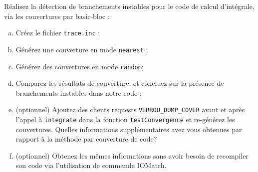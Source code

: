\documentclass[a4paper]{article}
\newcounter{Question}
\newenvironment{question}[1][\unskip]{
  \bigskip
  \stepcounter{Question}
  \def\questionTitle{ #1}
  \begin{mdframed}[style=question]
  }{
  \end{mdframed}
}
\begin{document}
\begin{question}
  Réalisez la détection de branchements instables pour le code de calcul d'intégrale,
  via les couvertures par basic-bloc :
  \begin{enumerate}[(a)]
  \item Créez le fichier \texttt{trace.inc} ;

  \item Générez une couverture en mode \texttt{nearest} ;
  \item Générez des couvertures en mode \texttt{random};
    
  \item Comparez les résultats de couverture, et concluez sur la présence de
    branchements instables dans notre code ;

  \item (optionnel) Ajoutez des clients requests \texttt{VERROU\_DUMP\_COVER} avant et après l'appel à \texttt{integrate} dans la fonction \texttt{testConvergence} et re-générez les couvertures. 
    Quelles informations supplémentaires avez vous obtenues par rapport à la méthode par couverture de code?

  \item (optionnel) Obtenez les mêmes informations sans avoir besoin de recompiler son code via l'utilisation de commande IOMatch. 
  \end{enumerate}
\end{question}










\end{document}
